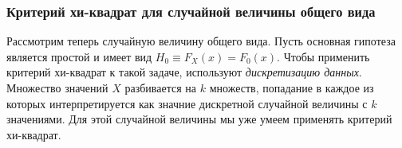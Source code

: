 \subsubsection{Критерий хи-квадрат для случайной величины общего вида}
Рассмотрим теперь случайную величину общего вида. Пусть основная гипотеза
является простой и имеет вид $H_0 \equiv F_X(x) = F_0(x)$. Чтобы применить 
критерий хи-квадрат к такой задаче, используют \textit{дискретизацию данных}.
Множество значений $X$ разбивается на $k$ множеств, попадание в каждое из
которых интерпретируется как значние дискретной случайной величины с $k$
значениями. Для этой случайной величины мы уже умеем применять критерий
хи-квадрат.

